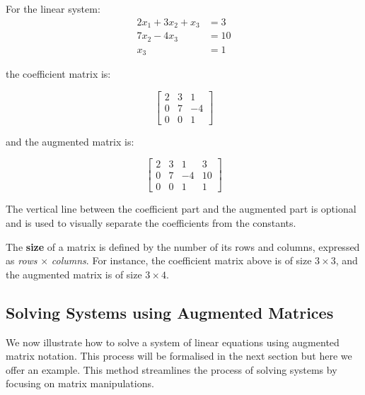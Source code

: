 \begin{example} For the linear system:
\[
\begin{aligned}
2 x_1+3 x_2+x_3 & =3 \\
7 x_2-4 x_3 & =10 \\
x_3 & =1
\end{aligned}
\]

the coefficient matrix is:

\[
\left[\begin{array}{ccc}
2 & 3 & 1 \\
0 & 7 & -4 \\
0 & 0 & 1
\end{array}\right]
\]

and the augmented matrix is:

\[
\left[\begin{array}{ccc|c}
2 & 3 & 1 & 3 \\
0 & 7 & -4 & 10 \\
0 & 0 & 1 & 1
\end{array}\right]
\]

\end{example}

The vertical line between the coefficient part and the augmented part is optional and is used to visually separate the coefficients from the constants.

\begin{definition} The \textbf{size} of a matrix is defined by the number of its rows and columns, expressed as \emph{rows} $\times$ \emph{columns}. For instance, the coefficient matrix above is of size $3 \times 3$, and the augmented matrix is of size $3 \times 4$. \end{definition}

\subsection*{Solving Systems using Augmented Matrices}

We now illustrate how to solve a system of linear equations using augmented matrix notation. This process will be formalised in the next section but here we offer an example. This method streamlines the process of solving systems by focusing on matrix manipulations.

